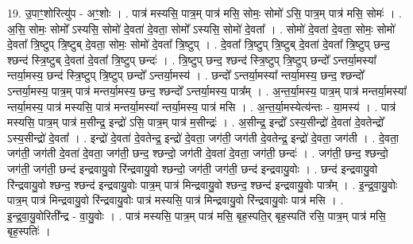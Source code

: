 \documentclass[17pt]{extarticle}
\begin{document}
19. उ॒पाꣳ॒॒शोरित्यु॑प - अꣳ॒॒शोः । . पात्र॑ मस्यसि॒ पात्र॒म् पात्र॑ मसि॒ सोमः॒ सोमो॑ ऽसि॒ पात्र॒म् पात्र॑ मसि॒ सोमः॑ । . अ॒सि॒ सोमः॒ सोमो᳚ ऽस्यसि॒ सोमो॑ दे॒वता॑ दे॒वता॒ सोमो᳚ ऽस्यसि॒ सोमो॑ दे॒वता᳚ । . सोमो॑ दे॒वता॑ दे॒वता॒ सोमः॒ सोमो॑ दे॒वता᳚ त्रि॒ष्टुप् त्रि॒ष्टुब् दे॒वता॒ सोमः॒ सोमो॑ दे॒वता᳚ त्रि॒ष्टुप् । . दे॒वता᳚ त्रि॒ष्टुप् त्रि॒ष्टुब् दे॒वता॑ दे॒वता᳚ त्रि॒ष्टुप् छन्द॒ श्छन्द॑ स्त्रि॒ष्टुब् दे॒वता॑ दे॒वता᳚ त्रि॒ष्टुप् छन्दः॑ । . त्रि॒ष्टुप् छन्द॒ श्छन्द॑ स्त्रि॒ष्टुप् त्रि॒ष्टुप् छन्दो᳚ ऽन्तर्या॒मस्या᳚ न्तर्या॒मस्य॒ छन्द॑ स्त्रि॒ष्टुप् त्रि॒ष्टुप् छन्दो᳚ ऽन्तर्या॒मस्य॑ । . छन्दो᳚ ऽन्तर्या॒मस्या᳚ न्तर्या॒मस्य॒ छन्द॒ श्छन्दो᳚ ऽन्तर्या॒मस्य॒ पात्र॒म् पात्र॑ मन्तर्या॒मस्य॒ छन्द॒ श्छन्दो᳚ ऽन्तर्या॒मस्य॒ पात्र᳚म् । . अ॒न्त॒र्या॒मस्य॒ पात्र॒म् पात्र॑ मन्तर्या॒मस्या᳚ न्तर्या॒मस्य॒ पात्र॑ मस्यसि॒ पात्र॑ मन्तर्या॒मस्या᳚ न्तर्या॒मस्य॒ पात्र॑ मसि । . अ॒न्त॒र्या॒मस्येत्य॑न्तः - या॒मस्य॑ । . पात्र॑ मस्यसि॒ पात्र॒म् पात्र॑ म॒सीन्द्र॒ इन्द्रो॑ ऽसि॒ पात्र॒म् पात्र॑ म॒सीन्द्रः॑ । . अ॒सीन्द्र॒ इन्द्रो᳚ ऽस्य॒सीन्द्रो॑ दे॒वता॑ दे॒वतेन्द्रो᳚ ऽस्य॒सीन्द्रो॑ दे॒वता᳚ । . इन्द्रो॑ दे॒वता॑ दे॒वतेन्द्र॒ इन्द्रो॑ दे॒वता॒ जग॑ती॒ जग॑ती दे॒वतेन्द्र॒ इन्द्रो॑ दे॒वता॒ जग॑ती । . दे॒वता॒ जग॑ती॒ जग॑ती दे॒वता॑ दे॒वता॒ जग॑ती॒ छन्द॒ श्छन्दो॒ जग॑ती दे॒वता॑ दे॒वता॒ जग॑ती॒ छन्दः॑ । . जग॑ती॒ छन्द॒ श्छन्दो॒ जग॑ती॒ जग॑ती॒ छन्द॑ इन्द्रवायु॒वो रि॑न्द्रवायु॒वो श्छन्दो॒ जग॑ती॒ जग॑ती॒ छन्द॑ इन्द्रवायु॒वोः । . छन्द॑ इन्द्रवायु॒वो रि॑न्द्रवायु॒वो श्छन्द॒ श्छन्द॑ इन्द्रवायु॒वोः पात्र॒म् पात्र॑ मिन्द्रवायु॒वो श्छन्द॒ श्छन्द॑ इन्द्रवायु॒वोः पात्र᳚म् । . इ॒न्द्र॒वा॒यु॒वोः पात्र॒म् पात्र॑ मिन्द्रवायु॒वो रि॑न्द्रवायु॒वोः पात्र॑ मस्यसि॒ पात्र॑ मिन्द्रवायु॒वो रि॑न्द्रवायु॒वोः पात्र॑ मसि । . इ॒न्द्र॒वा॒यु॒वोरिती᳚न्द्र - वा॒यु॒वोः । . पात्र॑ मस्यसि॒ पात्र॒म् पात्र॑ मसि॒ बृह॒स्पति॒र् बृह॒स्पति॑ रसि॒ पात्र॒म् पात्र॑ मसि॒ बृह॒स्पतिः॑ । \newline
\end{document}

